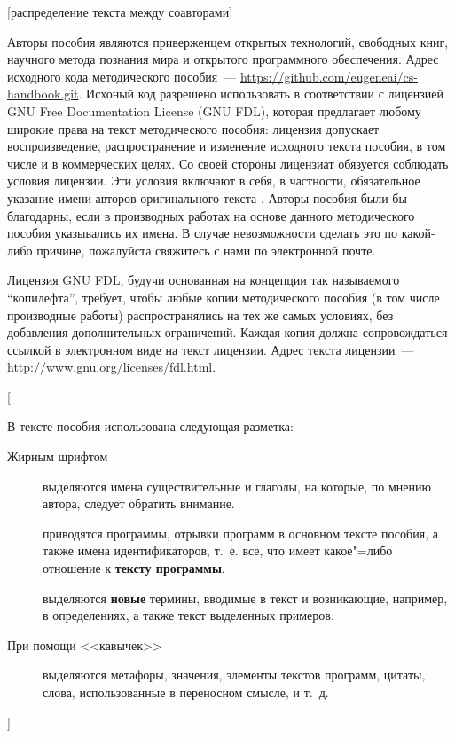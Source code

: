 \documentclass[14pt, openany, twoside, draft]{extbook} %
\newcommand{\e}[2][fcolor]{\textcolor{pcolor}{[}\textcolor{#1}{#2}\textcolor{pcolor}{]}}
\begin{document}
\e{распределение текста между соавторами}

Авторы пособия являются приверженцем открытых технологий, свободных
книг, научного метода познания мира и открытого программного
обеспечения.  Адрес исходного кода методического пособия~---
\url{https://github.com/eugeneai/cs-handbook.git}. Исхоный код
разрешено использовать в соответствии с лицензией
\foreignlanguage{english}{GNU Free Documentation License (GNU FDL)},
которая предлагает любому широкие права на текст методического
пособия: лицензия допускает воспроизведение, распространение и
изменение исходного текста пособия, в том числе и в коммерческих
целях.  Со своей стороны лицензиат обязуется соблюдать условия
лицензии.  Эти условия включают в себя, в частности, обязательное
указание имени авторов оригинального текста \cite{GNUFDL}.  Авторы
пособия были бы благодарны, если в производных работах на основе
данного методического пособия указывались их имена.  В случае
невозможности сделать это по какой-либо причине, пожалуйста свяжитесь
с нами по электронной почте.

Лицензия GNU FDL, будучи основанная на концепции так называемого
``копилефта'', требует, чтобы любые копии методического пособия (в том
числе производные работы) распространялись на тех же самых условиях,
без добавления дополнительных ограничений.  Каждая копия должна
сопровождаться ссылкой в электронном виде на текст лицензии.  Адрес текста лицензии~---  \url{http://www.gnu.org/licenses/fdl.html}.

\e{
В тексте пособия использована следующая разметка:
\begin{description}
\item[Жирным шрифтом] выделяются имена существительные и глаголы, на которые, по мнению автора, следует обратить внимание.
\item[\normalfont{\tt Моноширинным шрифтом}] приводятся программы, отрывки программ в основном тексте пособия, а также имена идентификаторов, т.~е. все, что имеет какое"=либо отношение к {\bf тексту программы}.
\item[\normalfont{\em Наклонным шрифтом}] выделяются {\bf новые} термины, вводимые в текст и возникающие, например, в определениях, а также текст выделенных примеров.
\item[\normalfont При помощи <<кавычек>>] выделяются метафоры, значения, элементы текстов программ, цитаты, слова, использованные в переносном смысле, и т.~д.
\end{description}
}
\end{document}
